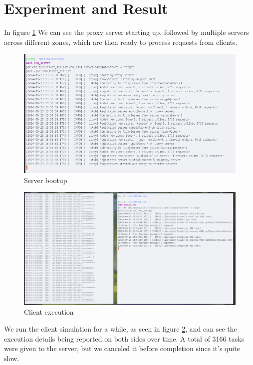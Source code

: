\documentclass{article}
\begin{document}
\section{Experiment and Result}
In figure \ref{fig:server-boot} We can see the proxy server starting up, followed by multiple servers across different zones, which are then ready to process requests from clients. 

\begin{figure}
    \centering
    \includegraphics[width=0.9\linewidth]{in5020_oblig1_execution_server.png}
    \caption{Server bootup}
    \label{fig:server-boot}
\end{figure}

\begin{figure}
    \centering
    \includegraphics[width=0.9\linewidth]{in5020_oblig1_execution_client.png}
    \caption{Client execution}
    \label{fig:client-execute}
\end{figure}

We run the client simulation for a while, as seen in figure \ref{fig:client-execute}, and can see the execution details being reported on both sides over time. A total of 3166 tasks were given to the server, but we canceled it before completion since it's quite slow.
\end{document}
